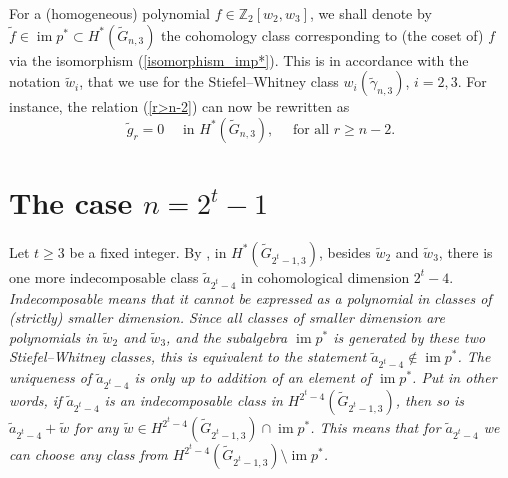 \documentclass{amsart}
\newcommand{\im}{\operatorname{im}}
\theoremstyle{definition}
\theoremstyle{remark}
\numberwithin{equation}{section}
\begin{document}
For a (homogeneous) polynomial $f\in\mathbb Z_2[w_2,w_3]$, we shall denote by $\widetilde f\in\im p^*\subset H^*(\widetilde G_{n,3})$ the cohomology class corresponding to (the coset of) $f$ via the isomorphism (\ref{isomorphism_imp*}). This is in accordance with the notation $\widetilde w_i$, that we use for the Stiefel--Whitney class $w_i(\widetilde\gamma_{n,3})$, $i=2,3$. For instance, the relation (\ref{r>n-2}) can now be rewritten as
\begin{equation}\label{r>=n-2}
\widetilde g_r=0 \quad \mbox{ in } H^*(\widetilde G_{n,3}),  \quad \mbox{ for all } r\ge n-2.
\end{equation}




\section{The case $n=2^t-1$}
\label{2t-1}

Let $t\ge3$ be a fixed integer. By \cite[Theorem A(b)]{BasuChakraborty}, in $H^*(\widetilde G_{2^t-1,3})$, besides $\widetilde w_2$ and $\widetilde w_3$, there is one more indecomposable class $\widetilde a_{2^t-4}$ in cohomological dimension $2^t-4$. \em Indecomposable \em means that it cannot be expressed as a polynomial in classes of (strictly) smaller dimension. Since all classes of smaller dimension are polynomials in $\widetilde w_2$ and $\widetilde w_3$, and the subalgebra $\im p^*$ is generated by these two Stiefel--Whitney classes, this is equivalent to the statement $\widetilde a_{2^t-4}\notin\im p^*$. The uniqueness of $\widetilde a_{2^t-4}$ is only up to addition of an element of $\im p^*$. Put in other words, if $\widetilde a_{2^t-4}$ is an indecomposable class in $H^{2^t-4}(\widetilde G_{2^t-1,3})$, then so is $\widetilde a_{2^t-4}+\widetilde w$ for any $\widetilde w\in H^{2^t-4}(\widetilde G_{2^t-1,3})\cap\im p^*$. This means that for $\widetilde a_{2^t-4}$ we can choose any class from $H^{2^t-4}(\widetilde G_{2^t-1,3})\setminus\im p^*$.
\end{document}
